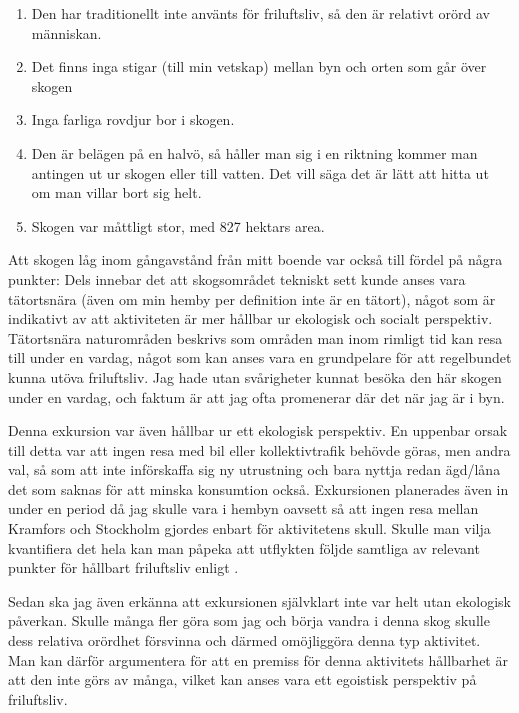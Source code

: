 \documentclass[12pt]{article}   %
\begin{document}
\begin{enumerate}
        \item Den har traditionellt inte använts för friluftsliv, så den är relativt orörd av människan.
        \item Det finns inga stigar (till min vetskap) mellan byn och orten som går över skogen\footnotemark{}
        \item Inga farliga rovdjur bor i skogen.\footnotemark{}
        \item Den är belägen på en halvö, så håller man sig i en riktning kommer man antingen ut ur skogen eller till vatten. Det vill säga det är lätt att hitta ut om man villar bort sig helt.
        \item Skogen var måttligt stor, med 827 hektars area.
\end{enumerate}

Att skogen låg inom gångavstånd från mitt boende var också till fördel på några punkter:
Dels innebar det att skogsområdet tekniskt sett kunde anses vara tätortsnära (även om min hemby per definition
inte är en tätort), något som är indikativt av att aktiviteten är mer hållbar ur ekologisk och socialt perspektiv.
Tätortsnära naturområden beskrivs som områden man inom rimligt
tid kan resa till under en vardag\cite{fredman2013friluftsliv}, något som kan anses vara en grundpelare för att
regelbundet kunna utöva friluftsliv. Jag hade utan svårigheter kunnat
besöka den här skogen under en vardag, och faktum är att jag ofta promenerar där det när jag är i byn.

Denna exkursion var även hållbar ur ett ekologisk perspektiv. En uppenbar orsak till detta var
att ingen resa med bil eller kollektivtrafik behövde göras, men andra val, så som att inte
införskaffa sig ny utrustning och bara nyttja redan ägd/låna det som saknas för att minska
konsumtion också. Exkursionen planerades även in under en period då jag skulle vara i hembyn
oavsett så att ingen resa mellan Kramfors och Stockholm gjordes enbart för aktivitetens skull.
Skulle man vilja kvantifiera det hela kan man påpeka att utflykten följde samtliga av
relevant punkter för hållbart friluftsliv enligt \cite{checklista}.

Sedan ska jag även erkänna att exkursionen självklart inte var helt utan ekologisk påverkan.
Skulle många fler göra som jag och börja vandra i denna skog skulle dess relativa orördhet
försvinna och därmed omöjliggöra denna typ aktivitet. Man kan därför argumentera för att en premiss
för denna aktivitets hållbarhet är att den inte görs av många, vilket kan anses vara ett egoistisk
perspektiv på friluftsliv.
\end{document}
